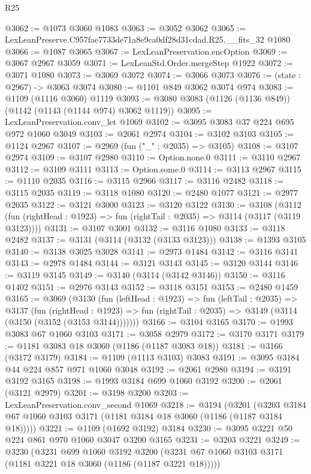 \begin{lexlean}{R25}
\begin{coremodule}
@3062 := @1073 @3060 @1083
@3063 := @3052 @3062
@3065 := LexLeanPreserve.C957fae7733de71a8e9ca0df28d31cdad.R25.__fits_32 @1080
@3066 := @1087 @3065
@3067 := LexLeanPreservation.encOption
@3069 := @3067 @2967 @3059
@3071 := LexLeanStd.Order.mergeStep @1922
@3072 := @3071 @1080
@3073 := @3069 @3072
@3074 := @3066 @3073
@3076 := (state : @2967) -> @3063 @3074
@3080 := @1101 @849 @3062 @3074 @974
@3083 := @1109 (@1116 @3060) @1119
@3093 := @3080 @3083 (@1126 (@1136 @849)) (@1142 (@1143 (@1144 @974) @3062 @1119))
@3095 := LexLeanPreservation.conv_let @1069
@3102 := @3095 @3083 @37 @224 @695 @972 @1060 @3049
@3103 := @2061 @2974
@3104 := @3102 @3103
@3105 := @1124 @2967
@3107 := @2969 (fun ("_" : @2035) => @3105)
@3108 := @3107 @2974
@3109 := @3107 @2980
@3110 := Option.none.{0}
@3111 := @3110 @2967
@3112 := @3109 @3111
@3113 := Option.some.{0}
@3114 := @3113 @2967
@3115 := @1110 @2035
@3116 := @3115 @2966
@3117 := @3116 @2482
@3118 := @3115 @2035
@3119 := @3118 @1080
@3120 := @2480 @1077
@3121 := @2977 @2035
@3122 := @3121 @3000
@3123 := @3120 @3122
@3130 := @3108
    (@3112 (fun (rightHead : @1923) => fun (rightTail : @2035) => @3114 (@3117 (@3119 @3123))))
@3131 := @3107 @3001
@3132 := @3116 @1080
@3133 := @3118 @2482
@3137 := @3131 (@3114 (@3132 (@3133 @3123)))
@3138 := @1393 @3105
@3140 := @3138 @3025 @3028
@3141 := @2973 @1484
@3142 := @3116 @3141
@3143 := @2978 @1484
@3144 := @3121 @3143
@3145 := @3120 @3144
@3146 := @3119 @3145
@3149 := @3140 (@3114 (@3142 @3146))
@3150 := @3116 @1402
@3151 := @2976 @3143
@3152 := @3118 @3151
@3153 := @2480 @1459
@3165 := @3069
    (@3130
      (fun (leftHead : @1923) =>
      fun (leftTail : @2035) =>
      @3137
        (fun (rightHead : @1923) =>
        fun (rightTail : @2035) => @3149 (@3114 (@3150 (@3152 (@3153 @3144)))))))
@3166 := @3104 @3165
@3170 := @1993 @3083 @67 @1060 @3103
@3171 := @3058 @2979
@3172 := @3170 @3171
@3179 := @1181 @3083 @18 @3060 (@1186 (@1187 @3083 @18))
@3181 := @3166 (@3172 @3179)
@3184 := @1109 (@1113 @3103) @3083
@3191 := @3095 @3184 @44 @224 @857 @971 @1060 @3048
@3192 := @2061 @2980
@3194 := @3191 @3192 @3165
@3198 := @1993 @3184 @699 @1060 @3192
@3200 := @2061 (@3121 @2979)
@3201 := @3198 @3200
@3203 := LexLeanPreservation.conv_second @1069
@3218 := @3194
    (@3201 (@3203 @3184 @67 @1060 @3103 @3171 (@1181 @3184 @18 @3060 (@1186 (@1187 @3184 @18)))))
@3221 := @1109 (@1692 @3192) @3184
@3230 := @3095 @3221 @50 @224 @861 @970 @1060 @3047 @3200 @3165
@3231 := @3203 @3221
@3249 := @3230
    (@3231
      @699
      @1060
      @3192
      @3200
      (@3231 @67 @1060 @3103 @3171 (@1181 @3221 @18 @3060 (@1186 (@1187 @3221 @18)))))

\end{coremodule}
\end{lexlean}
